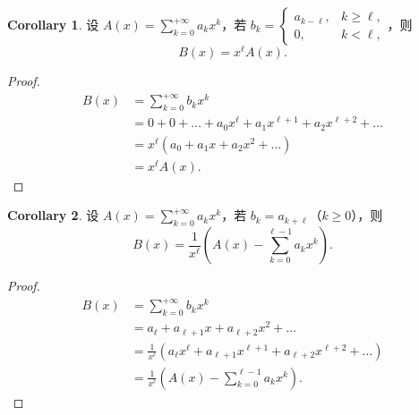 \documentclass[oneside]{book}
\theoremstyle{definition}
\newtheorem{corollary}{Corollary}[section]
\begin{document}
	
	\begin{corollary}
		设 \( A(x) = \sum_{k=0}^{+\infty} a_k x^k \)，若 \( b_k = \begin{cases}
			a_{k-\ell}, & k \ge \ell, \\
			0, & k < \ell,
		\end{cases} \)，则
		\[
		B(x) = x^\ell A(x).
		\]
	\end{corollary}
	\begin{proof}
		\[
		\begin{aligned}
			B(x) &= \sum_{k=0}^{+\infty} b_k x^k \\
			&= 0 + 0 + \dots + a_0 x^\ell + a_1 x^{\ell+1} + a_2 x^{\ell+2} + \dots \\
			&= x^\ell \left( a_0 + a_1 x + a_2 x^2 + \dots \right) \\
			&= x^\ell A(x).
		\end{aligned}
		\]
	\end{proof}
	
	\begin{corollary}
		设 \( A(x) = \sum_{k=0}^{+\infty} a_k x^k \)，若 \( b_k = a_{k+\ell} \)（\( k \ge 0 \)），则
		\[
		B(x) = \frac{1}{x^\ell} \left( A(x) - \sum_{k=0}^{\ell-1} a_k x^k \right).
		\]
	\end{corollary}
	\begin{proof}
		\[
		\begin{aligned}
			B(x) &= \sum_{k=0}^{+\infty} b_k x^k \\
			&= a_\ell + a_{\ell+1} x + a_{\ell+2} x^2 + \dots \\
			&= \frac{1}{x^\ell} \left( a_\ell x^\ell + a_{\ell+1} x^{\ell+1} + a_{\ell+2} x^{\ell+2} + \dots \right) \\
			&= \frac{1}{x^\ell} \left( A(x) - \sum_{k=0}^{\ell-1} a_k x^k \right).
		\end{aligned}
		\]
	\end{proof}
	
\end{document}
